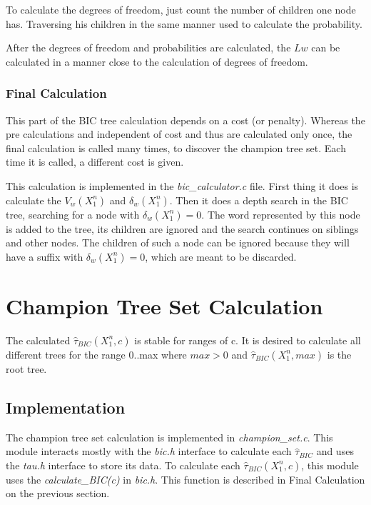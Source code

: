 \documentclass[brazil,11pt]{article}
\begin{document}
To calculate the degrees of freedom, just count the number of children one node has. Traversing his children in the same manner used to calculate the probability.

After the degrees of freedom and probabilities are calculated, the $Lw$ can be calculated in a manner close to the calculation of degrees of freedom.

\subsubsection{Final Calculation}

This part of the BIC tree calculation depends on a cost (or penalty). Whereas the pre calculations and independent of cost and thus are calculated only once, the final calculation is called many times, to discover the champion tree set. Each time it is called, a different cost is given.

This calculation is implemented in the \emph{bic\_calculator.c} file. First thing it does is calculate the $V_w(X^n_1)$ and $\delta_w(X^n_1)$. Then it does a depth search in the BIC tree, searching for a node with $\delta_w(X^n_1) = 0$. The word represented by this node is added to the tree, its children are ignored and the search continues on siblings and other nodes. The children of such a node can be ignored because they will have a suffix with $\delta_w(X^n_1) = 0$, which are meant to be discarded.

\section{Champion Tree Set Calculation}

The calculated $\hat{\tau}_{BIC}(X^n_1, c)$ is stable for ranges of c. It is desired to calculate all different trees for the range 0..max where $max > 0$ and $\hat{\tau}_{BIC}(X^n_1, max)$ is the root tree.

\subsection{Implementation}

The champion tree set calculation is implemented in \emph{champion\_set.c}. This module interacts mostly with the \emph{bic.h} interface to calculate each $\hat{\tau}_{BIC}$ and uses the \emph{tau.h} interface to store its data. To calculate each $\hat{\tau}_{BIC}(X^n_1, c)$, this module uses the \emph{calculate\_BIC(c)} in \emph{bic.h}. This function is described in Final Calculation on the previous section.
\end{document}
